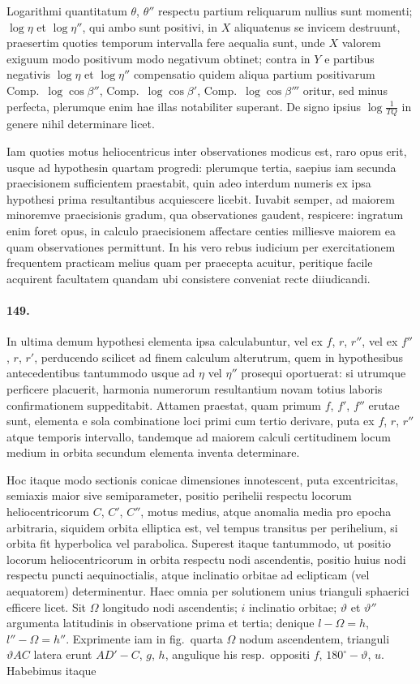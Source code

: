 \documentclass[12pt,a4paper]{article}
\begin{document}
Logarithmi quantitatum $\theta$, $\theta''$ respectu partium reliquarum nullius sunt momenti; $\log\eta$ et $\log\eta''$, qui ambo sunt positivi, in $X$ aliquatenus se invicem destruunt, praesertim quoties temporum intervalla fere aequalia sunt, unde $X$ valorem exiguum modo positivum modo negativum obtinet; contra in $Y$ e partibus negativis $\log\eta$ et $\log\eta''$ compensatio quidem aliqua partium positivarum Comp.~$\log\cos\beta''$, Comp.~$\log\cos\beta'$, Comp.~$\log\cos\beta'''$ oritur, sed minus perfecta, plerumque enim hae illas notabiliter superant. De signo ipsius $\log\frac{1}{TQ}$ in genere nihil determinare licet.

Iam quoties motus heliocentricus inter observationes modicus est, raro opus erit, usque ad hypothesin quartam progredi: plerumque tertia, saepius iam secunda praecisionem sufficientem praestabit, quin adeo interdum numeris ex ipsa hypothesi prima resultantibus acquiescere licebit. Iuvabit semper, ad maiorem minoremve praecisionis gradum, qua observationes gaudent, respicere: ingratum enim foret opus, in calculo praecisionem affectare centies milliesve maiorem ea quam observationes permittunt. In his vero rebus iudicium per exercitationem frequentem practicam melius quam per praecepta acuitur, peritique facile acquirent facultatem quandam ubi consistere conveniat recte diiudicandi.

\paragraph{149.}
In ultima demum hypothesi elementa ipsa calculabuntur, vel ex $f$, $r$, $r''$, vel ex $f''$, $r$, $r'$, perducendo scilicet ad finem calculum alterutrum, quem in hypothesibus antecedentibus tantummodo usque ad $\eta$ vel $\eta''$ prosequi oportuerat: si utrumque perficere placuerit, harmonia numerorum resultantium novam totius laboris confirmationem suppeditabit. Attamen praestat, quam primum $f$, $f'$, $f''$ erutae sunt, elementa e sola combinatione loci primi cum tertio derivare, puta ex $f$, $r$, $r''$ atque temporis intervallo, tandemque ad maiorem calculi certitudinem locum medium in orbita secundum elementa inventa determinare.

Hoc itaque modo sectionis conicae dimensiones innotescent, puta excentricitas, semiaxis maior sive semiparameter, positio perihelii respectu locorum heliocentricorum $C$, $C'$, $C''$, motus medius, atque anomalia media pro epocha arbitraria, siquidem orbita elliptica est, vel tempus transitus per perihelium, si orbita fit hyperbolica vel parabolica. Superest itaque tantummodo, ut positio locorum heliocentricorum in orbita respectu nodi ascendentis, positio huius nodi respectu puncti aequinoctialis, atque inclinatio orbitae ad eclipticam (vel aequatorem) determinentur. Haec omnia per solutionem unius trianguli sphaerici efficere licet. Sit $\Omega$ longitudo nodi ascendentis; $i$ inclinatio orbitae; $\vartheta$ et $\vartheta''$ argumenta latitudinis in observatione prima et tertia; denique $l - \Omega = h$, $l'' - \Omega = h''$. Exprimente iam in fig.~quarta $\Omega$ nodum ascendentem, trianguli $\vartheta AC$ latera erunt $AD' - C$, $g$, $h$, angulique his resp.~oppositi $f$, $180^\circ - \vartheta$, $u$. Habebimus itaque
\end{document}
